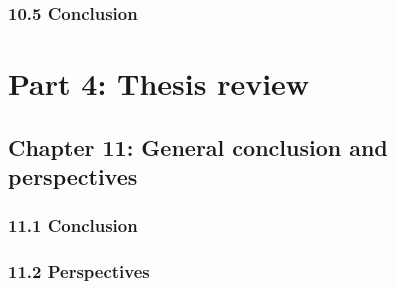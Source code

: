 \subsubsection*{10.5 Conclusion }



\section*{Part 4: Thesis review}
\subsection*{Chapter 11:  General conclusion and perspectives }
\subsubsection*{11.1 Conclusion }
\subsubsection*{11.2 Perspectives} 


%
%
%
%
%
